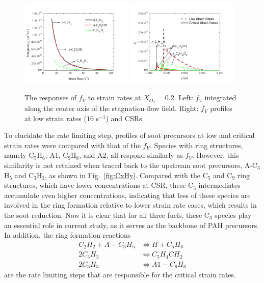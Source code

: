 \documentclass[preprint,3p,times,twocolumn]{elsarticleUS}
\begin{document}
\begin{figure}[h]
  \centering
  \scriptsize
  \includegraphics[trim=4mm 8mm 30mm 20mm, clip=true, width=0.48\textwidth]{SV-SR.png}
  \includegraphics[trim=4mm 8mm 30mm 20mm, clip=true, width=0.48\textwidth]{fv-y.png}
  \normalsize
  \vspace{-0.2in}
  \caption{The responses of $f_V$ to strain rates at $X_{O_2}=0.2$. Left: $f_V$ integrated along the center axis of the stagnation-flow field. Right: $f_V$ profiles at low strain rates ($16$ s$^{-1}$) and CSRs.}
  \label{fig:fv-SR-combo}
\end{figure}

To elucidate the rate limiting step, profiles of soot precursors at low and critical strain rates were compared with that of the $f_V$. Species with ring structures, namely C$_5$H$_6$, A1, C$_9$H$_8$, and A2, all respond similarly as $f_V$. However, this similarity is not retained when traced back to the upstream soot precursors, A-C$_3$H$_5$ and C$_3$H$_3$, as shown in Fig.~\ref{fig:CxHy}. Compared with the C$_5$ and C$_9$ ring structures, which have lower concentrations at CSR, these C$_3$ intermediates accumulate even higher concentrations, indicating that less of these species are involved in the ring formation relative to lower strain rate cases, which results in the soot reduction. Now it is clear that for all three fuels, these C$_3$ species play an essential role in current study, as it serves as the backbone of PAH precursors. In addition, the ring formation reactions 
\begin{align*}
  C_2H_2 + A-C_3H_5 &\Longleftrightarrow H + C_5H_6\\
  2 C_3H_3 &\Longleftrightarrow C_5H_4CH_2\\
  2 C_3H_3 &\Longleftrightarrow A1-C_6H_6
\end{align*}
are the rate limiting steps that are responsible for the critical strain rates.
\end{document}
